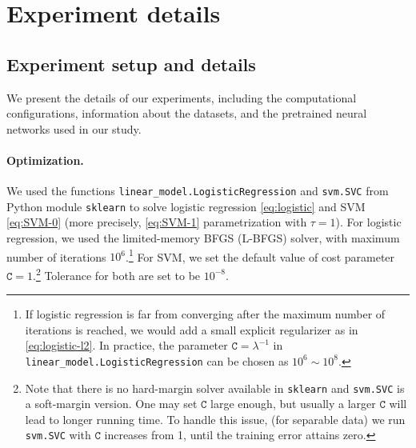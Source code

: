 \section{Experiment details}
\label{append_sec:exp}

\subsection{Experiment setup and details}

We present the details of our experiments, including the computational configurations, information about the datasets, and the pretrained neural networks used in our study.

\paragraph{Optimization.} We used the functions \texttt{linear\_model.LogisticRegression} and \texttt{svm.SVC} from Python module \texttt{sklearn} to solve logistic regression \cref{eq:logistic} and SVM \cref{eq:SVM-0} (more precisely, \cref{eq:SVM-1} parametrization with $\tau = 1$). For logistic regression, we used the limited-memory BFGS (L-BFGS) solver, with maximum number of iterations $10^6$.\footnote{If logistic regression is far from converging after the maximum number of iterations is reached, we would add a small explicit regularizer as in \cref{eq:logistic-l2}. In practice, the parameter $\mathtt{C} = \lambda^{-1}$ in \texttt{linear\_model.LogisticRegression} can be chosen as $10^6 \sim 10^8$.} 
For SVM, we set the default value of cost parameter $\mathtt{C} = 1$.\footnote{Note that there is no hard-margin solver available in \texttt{sklearn} and \texttt{svm.SVC} is a soft-margin version. One may set $\mathtt{C}$ large enough, but usually a larger $\mathtt{C}$ will lead to longer running time. To handle this issue, (for separable data) we run \texttt{svm.SVC} with $\mathtt{C}$ increases from 1, until the training error attains zero.} Tolerance for both are set to be $10^{-8}$.

